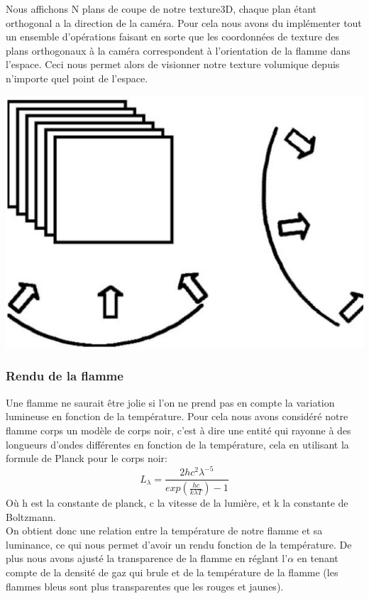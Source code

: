 \documentclass[a4paper,10pt]{article}
\begin{document}
Nous affichons N plans de coupe de notre texture3D, chaque plan étant orthogonal a la direction de la caméra. Pour cela nous avons du implémenter tout un ensemble d'opérations faisant en sorte que les coordonnées de texture des plans orthogonaux à 
la caméra correspondent à l'orientation de la flamme dans l'espace. Ceci nous permet alors de visionner notre texture volumique depuis n'importe quel point de l'espace.\\
\begin{center}
\includegraphics[scale=0.3]{plan_en_coupe.ps}
\end{center}


\subsubsection{Rendu de la flamme}

Une flamme ne saurait être jolie si l'on ne prend pas en compte la variation lumineuse en fonction de la température. Pour cela nous avons considéré notre flamme corps un modèle de corps noir, c'est à dire une entité qui rayonne à des longueurs d'ondes différentes en fonction de la température, cela en utilisant la formule de Planck pour le corps noir:\\

\begin{equation}
	L_{\lambda} = \frac{2hc^{2}\lambda^{-5}}{exp(\frac{hc}{k\lambda T})-1}
\end{equation}
Où h est la constante de planck, c la vitesse de la lumière, et k la constante de Boltzmann.\\

On obtient donc une relation entre la température de notre flamme et sa luminance, ce qui nous permet d'avoir un rendu fonction de la température. De plus nous avons ajusté la transparence de la flamme en réglant l'$\alpha$ en tenant compte de la densité de gaz qui brule et de la température de la flamme (les flammes bleus sont plus transparentes que les rouges et jaunes).\\
\end{document}
